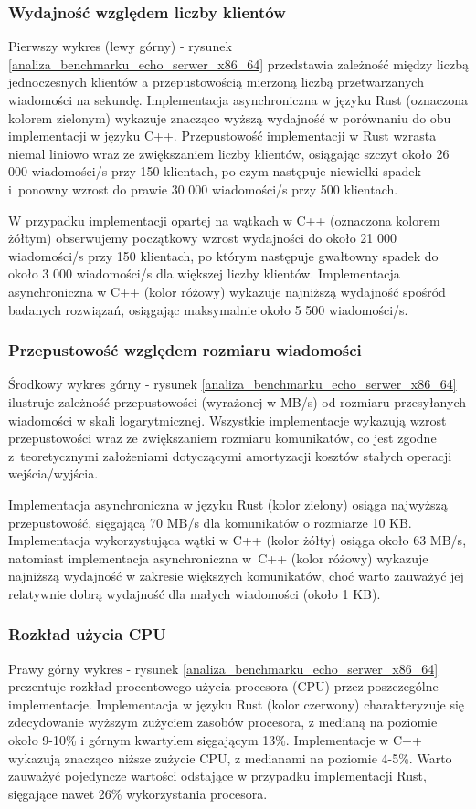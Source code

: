 \subsubsection{Wydajność względem liczby klientów}
Pierwszy wykres (lewy górny) - rysunek \ref{analiza_benchmarku_echo_serwer_x86_64} przedstawia zależność między liczbą jednoczesnych klientów a przepustowością mierzoną liczbą przetwarzanych wiadomości na sekundę. Implementacja asynchroniczna w języku Rust (oznaczona kolorem zielonym) wykazuje znacząco wyższą wydajność w porównaniu do obu implementacji w języku C++. Przepustowość implementacji w Rust wzrasta niemal liniowo wraz ze zwiększaniem liczby klientów, osiągając szczyt około 26 000 wiadomości/s przy 150 klientach, po czym następuje niewielki spadek i~ponowny wzrost do prawie 30 000 wiadomości/s przy 500 klientach.

W przypadku implementacji opartej na wątkach w C++ (oznaczona kolorem żółtym) obserwujemy początkowy wzrost wydajności do około 21 000 wiadomości/s przy 150 klientach, po którym następuje gwałtowny spadek do około 3 000 wiadomości/s dla większej liczby klientów. Implementacja asynchroniczna w C++ (kolor różowy) wykazuje najniższą wydajność spośród badanych rozwiązań, osiągając maksymalnie około 5 500 wiadomości/s.

\subsubsection{ Przepustowość względem rozmiaru wiadomości}
Środkowy wykres górny - rysunek \ref{analiza_benchmarku_echo_serwer_x86_64} ilustruje zależność przepustowości (wyrażonej w MB/s) od rozmiaru przesyłanych wiadomości w skali logarytmicznej. Wszystkie implementacje wykazują wzrost przepustowości wraz ze zwiększaniem rozmiaru komunikatów, co jest zgodne z~teoretycznymi założeniami dotyczącymi amortyzacji kosztów stałych operacji wejścia/wyjścia.

Implementacja asynchroniczna w języku Rust (kolor zielony) osiąga najwyższą przepustowość, sięgającą 70 MB/s dla komunikatów o rozmiarze 10 KB. Implementacja wykorzystująca wątki w C++ (kolor żółty) osiąga około 63 MB/s, natomiast implementacja asynchroniczna w~C++ (kolor różowy) wykazuje najniższą wydajność w zakresie większych komunikatów, choć warto zauważyć jej relatywnie dobrą wydajność dla małych wiadomości (około 1 KB).

\subsubsection{Rozkład użycia CPU}
Prawy górny wykres - rysunek \ref{analiza_benchmarku_echo_serwer_x86_64} prezentuje rozkład procentowego użycia procesora (CPU) przez poszczególne implementacje. Implementacja w języku Rust (kolor czerwony) charakteryzuje się zdecydowanie wyższym zużyciem zasobów procesora, z medianą na poziomie około 9-10\% i górnym kwartylem sięgającym 13\%. Implementacje w C++ wykazują znacząco niższe zużycie CPU, z medianami na poziomie 4-5\%. Warto zauważyć pojedyncze wartości odstające w przypadku implementacji Rust, sięgające nawet 26\% wykorzystania procesora.

